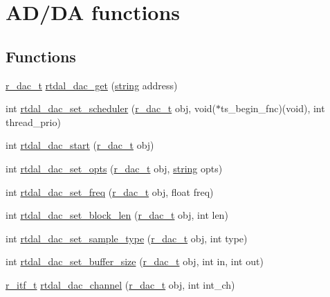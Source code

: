 \hypertarget{group__dac}{\section{A\-D/\-D\-A functions}
\label{group__dac}
}
\subsection*{Functions}
\begin{DoxyCompactItemize}
\item 
\hyperlink{rtdal__types_8h_aa78f7bbd07935ad587fc182f06d4314c}{r\-\_\-dac\-\_\-t} \hyperlink{group__dac_gaff5e7e1792a4758afbda926040eac76e}{rtdal\-\_\-dac\-\_\-get} (\hyperlink{str_8h_a25093e36e9fb377b246945a84745823f}{string} address)
\item 
int \hyperlink{group__dac_ga468eb9f78e60554a8236e20367169d56}{rtdal\-\_\-dac\-\_\-set\-\_\-scheduler} (\hyperlink{rtdal__types_8h_aa78f7bbd07935ad587fc182f06d4314c}{r\-\_\-dac\-\_\-t} obj, void($\ast$ts\-\_\-begin\-\_\-fnc)(void), int thread\-\_\-prio)
\item 
int \hyperlink{group__dac_gab08a9438c2ad7cf18cab3de4a64e5819}{rtdal\-\_\-dac\-\_\-start} (\hyperlink{rtdal__types_8h_aa78f7bbd07935ad587fc182f06d4314c}{r\-\_\-dac\-\_\-t} obj)
\item 
int \hyperlink{group__dac_gac186bb2c1bcc2efa631afa345f10246d}{rtdal\-\_\-dac\-\_\-set\-\_\-opts} (\hyperlink{rtdal__types_8h_aa78f7bbd07935ad587fc182f06d4314c}{r\-\_\-dac\-\_\-t} obj, \hyperlink{str_8h_a25093e36e9fb377b246945a84745823f}{string} opts)
\item 
int \hyperlink{group__dac_ga7b4a01c43289c4ea1d86cb09e0a29bec}{rtdal\-\_\-dac\-\_\-set\-\_\-freq} (\hyperlink{rtdal__types_8h_aa78f7bbd07935ad587fc182f06d4314c}{r\-\_\-dac\-\_\-t} obj, float freq)
\item 
int \hyperlink{group__dac_gaee6866e76380d1c6feb3a666eb9c1485}{rtdal\-\_\-dac\-\_\-set\-\_\-block\-\_\-len} (\hyperlink{rtdal__types_8h_aa78f7bbd07935ad587fc182f06d4314c}{r\-\_\-dac\-\_\-t} obj, int len)
\item 
int \hyperlink{group__dac_ga2c3a32c2b3d7ca71ecb35e5952c264ca}{rtdal\-\_\-dac\-\_\-set\-\_\-sample\-\_\-type} (\hyperlink{rtdal__types_8h_aa78f7bbd07935ad587fc182f06d4314c}{r\-\_\-dac\-\_\-t} obj, int type)
\item 
int \hyperlink{group__dac_gadc2a3f939e74bf6fe77313750e7aafd2}{rtdal\-\_\-dac\-\_\-set\-\_\-buffer\-\_\-size} (\hyperlink{rtdal__types_8h_aa78f7bbd07935ad587fc182f06d4314c}{r\-\_\-dac\-\_\-t} obj, int in, int out)
\item 
\hyperlink{rtdal__types_8h_a95fa1c8ca0f279eeb420f2083f6bee5d}{r\-\_\-itf\-\_\-t} \hyperlink{group__dac_gadf9f5663d3645ef44995627315ed1388}{rtdal\-\_\-dac\-\_\-channel} (\hyperlink{rtdal__types_8h_aa78f7bbd07935ad587fc182f06d4314c}{r\-\_\-dac\-\_\-t} obj, int int\-\_\-ch)
\end{DoxyCompactItemize}


